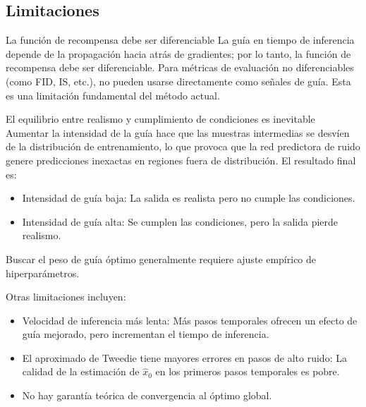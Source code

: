 \subsection{Limitaciones}

\begin{warningbox}{La función de recompensa debe ser diferenciable}
La guía en tiempo de inferencia depende de la propagación hacia atrás de gradientes; por lo tanto, la función de recompensa debe ser diferenciable. Para métricas de evaluación no diferenciables (como FID, IS, etc.), no pueden usarse directamente como señales de guía. Esta es una limitación fundamental del método actual.
\end{warningbox}

\begin{warningbox}{El equilibrio entre realismo y cumplimiento de condiciones es inevitable}
Aumentar la intensidad de la guía hace que las muestras intermedias se desvíen de la distribución de entrenamiento, lo que provoca que la red predictora de ruido genere predicciones inexactas en regiones fuera de distribución. El resultado final es:
\begin{itemize}
    \item Intensidad de guía baja: La salida es realista pero no cumple las condiciones.
    \item Intensidad de guía alta: Se cumplen las condiciones, pero la salida pierde realismo.
\end{itemize}
Buscar el peso de guía óptimo generalmente requiere ajuste empírico de hiperparámetros.
\end{warningbox}

Otras limitaciones incluyen:
\begin{itemize}
    \item Velocidad de inferencia más lenta: Más pasos temporales ofrecen un efecto de guía mejorado, pero incrementan el tiempo de inferencia.
    \item El aproximado de Tweedie tiene mayores errores en pasos de alto ruido: La calidad de la estimación de $\hat{x}_0$ en los primeros pasos temporales es pobre.
    \item No hay garantía teórica de convergencia al óptimo global.
\end{itemize}

